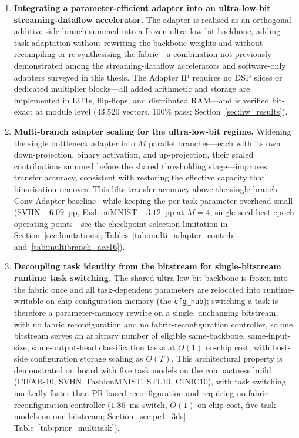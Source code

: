 \documentclass[12pt, a4paper]{report}
\numberwithin{equation}{chapter}
\numberwithin{figure}{chapter}
\numberwithin{table}{chapter}
\numberwithin{algorithm}{chapter}
\begin{document}
\begin{enumerate}
    \item \textbf{Integrating a parameter-efficient adapter into an ultra-low-bit streaming-dataflow accelerator.} The adapter is realised as an orthogonal additive side-branch summed into a frozen ultra-low-bit backbone, adding task adaptation without rewriting the backbone weights and without recompiling or re-synthesising the fabric---a combination not previously demonstrated among the streaming-dataflow accelerators and software-only adapters surveyed in this thesis. The Adapter IP requires no DSP slices or dedicated multiplier blocks---all added arithmetic and storage are implemented in LUTs, flip-flops, and distributed RAM---and is verified bit-exact at module level (43{,}520 vectors, 100\% pass; Section~\ref{sec:hw_results}).

    \item \textbf{Multi-branch adapter scaling for the ultra-low-bit regime.} Widening the single bottleneck adapter into $M$ parallel branches---each with its own down-projection, binary activation, and up-projection, their scaled contributions summed before the shared thresholding stage---improves transfer accuracy, consistent with restoring the effective capacity that binarisation removes. This lifts transfer accuracy above the single-branch Conv-Adapter baseline~\cite{Chen2024ConvAdapter} while keeping the per-task parameter overhead small (SVHN $+6.09$~pp, FashionMNIST $+3.12$~pp at $M{=}4$, single-seed best-epoch operating points---see the checkpoint-selection limitation in Section~\ref{sec:limitations}; Tables~\ref{tab:multi_adapter_contrib} and~\ref{tab:multibranch_acc16}).

    \item \textbf{Decoupling task identity from the bitstream for single-bitstream runtime task switching.} The shared ultra-low-bit backbone is frozen into the fabric once and all task-dependent parameters are relocated into runtime-writable on-chip configuration memory (the \texttt{cfg\_hub}); switching a task is therefore a parameter-memory rewrite on a single, unchanging bitstream, with no fabric reconfiguration and no fabric-reconfiguration controller, so one bitstream serves an arbitrary number of eligible same-backbone, same-input-size, same-output-head classification tasks at $O(1)$ on-chip cost, with host-side configuration storage scaling as $O(T)$. This architectural property is demonstrated on board with five task models on the compactness build (CIFAR-10, SVHN, FashionMNIST, STL10, CINIC10), with task switching markedly faster than PR-based reconfiguration and requiring no fabric-reconfiguration controller ($1.86$~ms switch, $O(1)$ on-chip cost, five task models on one bitstream; Section~\ref{sec:pe1_3ds}, Table~\ref{tab:prior_multitask}).
\end{enumerate}
\end{document}
